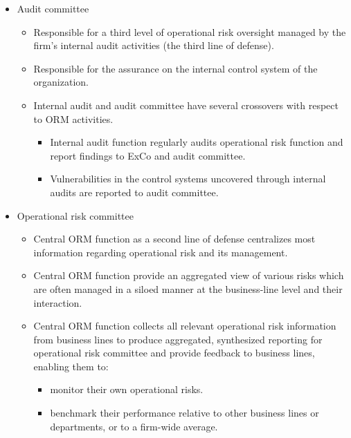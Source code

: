 \begin{itemize}
\item Audit committee
    \begin{itemize}
    \item Responsible for a third level of operational risk oversight managed by the firm's internal audit activities (the third line of defense).
    \item  Responsible for the assurance on the internal control system of the organization.
    \item Internal audit and audit committee have several crossovers with respect to ORM activities.
        \begin{itemize}
        \item Internal audit function regularly audits operational risk function and report findings to ExCo and audit committee.
        \item  Vulnerabilities in the control systems uncovered through internal audits are reported to audit committee.
        
        \end{itemize}
    \end{itemize}
\item Operational risk committee
    \begin{itemize}
    \item Central ORM function as a second line of defense centralizes most information regarding operational risk and its management.
    \item Central ORM function provide an aggregated view of various risks which are often managed in a siloed manner at the business-line level and their interaction.
    \item Central ORM function collects all relevant operational risk information from business lines to produce aggregated, synthesized reporting for operational risk committee and provide feedback to business lines, enabling them to:
        \begin{itemize}
        \item monitor their own operational risks.
        \item benchmark their performance relative to other business lines or departments, or to a firm-wide average.
        \end{itemize}
    
    \end{itemize}


\end{itemize}



